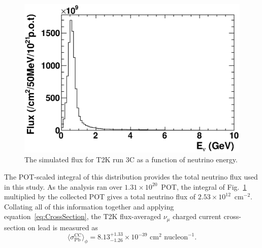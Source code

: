 \begin{figure}
  \centering
  \includegraphics[width=15cm]{images/measurement/xsec/run3c_flux.eps}
  \caption{The simulated flux for T2K run 3C as a function of neutrino energy.}
  \label{fig:Run3CFlux}
\end{figure}
The POT-scaled integral of this distribution provides the total neutrino flux used in this study.  As the analysis ran over $1.31\times10^{20}$~POT, the integral of Fig.~\ref{fig:Run3CFlux} multiplied by the collected POT gives a total neutrino flux of $2.53\times10^{12}$~cm$^{-2}$.
\newline
\newline
Collating all of this information together and applying equation~\ref{eq:CrossSection}, the T2K flux-averaged $\nu_\mu$ charged current cross-section on lead is measured as 
\begin{equation}
\langle \sigma^{\textrm{CC}}_{\textrm{Pb}} \rangle_{\phi} = 8.13^{+1.33}_{-1.26} \times 10^{-39} \textrm{ cm}^2 \textrm{ nucleon}^{-1}.
\end{equation}






